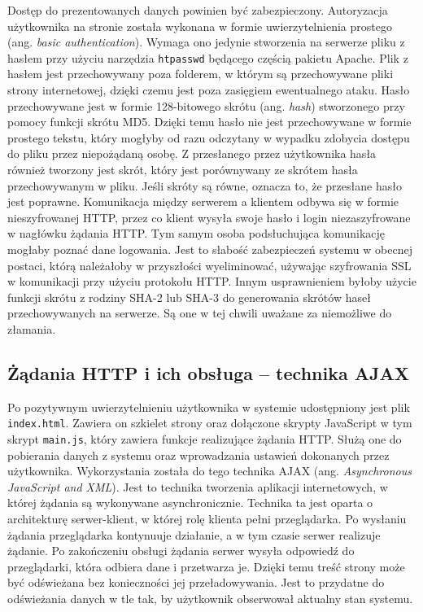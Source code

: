 \documentclass[a4paper,11pt,twoside]{article}
\begin{document}
Dostęp do prezentowanych danych powinien być zabezpieczony. Autoryzacja użytkownika na stronie została wykonana w formie uwierzytelnienia prostego (ang. \textit{basic authentication}). Wymaga ono jedynie stworzenia na serwerze pliku z hasłem przy użyciu narzędzia \texttt{htpasswd} będącego częścią pakietu Apache. Plik z hasłem jest przechowywany poza folderem, w którym są przechowywane pliki strony internetowej, dzięki czemu jest poza zasięgiem ewentualnego ataku. Hasło przechowywane jest w formie 128-bitowego skrótu (ang. \textit{hash}) stworzonego przy pomocy funkcji skrótu MD5.\cite{apache-password} Dzięki temu hasło nie jest przechowywane w formie prostego tekstu, który mogłyby od razu odczytany w wypadku zdobycia dostępu do pliku przez niepożądaną osobę. Z przesłanego przez użytkownika hasła również tworzony jest skrót, który jest porównywany ze skrótem hasła przechowywanym w pliku. Jeśli skróty są równe, oznacza to, że przesłane hasło jest poprawne. Komunikacja między serwerem a klientem odbywa się w formie nieszyfrowanej HTTP, przez co klient wysyła swoje hasło i login niezaszyfrowane w nagłówku żądania HTTP.\cite{http-auth} Tym samym osoba podsłuchująca komunikację mogłaby poznać dane logowania. Jest to słabość zabezpieczeń systemu w obecnej postaci, którą należałoby w przyszłości wyeliminować, używając szyfrowania SSL w komunikacji przy użyciu protokołu HTTP. Innym usprawnieniem byłoby użycie funkcji skrótu z rodziny SHA-2 lub SHA-3 do generowania skrótów haseł przechowywanych na serwerze. Są one w tej chwili uważane za niemożliwe do złamania.
 
\subsection{Żądania HTTP i ich obsługa -- technika AJAX}
Po pozytywnym uwierzytelnieniu użytkownika w systemie udostępniony jest plik \texttt{index.html}. Zawiera on szkielet strony oraz dołączone skrypty JavaScript w tym skrypt \texttt{main.js}, który zawiera funkcje realizujące żądania HTTP. Służą one do pobierania danych z systemu oraz wprowadzania ustawień dokonanych przez użytkownika. Wykorzystania została do tego technika AJAX (ang. \textit{Asynchronous JavaScript and XML}). Jest to technika tworzenia aplikacji internetowych, w której żądania są wykonywane asynchronicznie. Technika ta jest oparta o architekturę serwer-klient, w której rolę klienta pełni przeglądarka. Po wysłaniu żądania przeglądarka kontynuuje działanie, a w tym czasie serwer realizuje żądanie. Po zakończeniu obsługi żądania serwer wysyła odpowiedź do przeglądarki, która odbiera dane i przetwarza je. Dzięki temu treść strony może być odświeżana bez konieczności jej przeładowywania. Jest to przydatne do odświeżania danych w tle tak, by użytkownik obserwował aktualny stan systemu.
\end{document}
